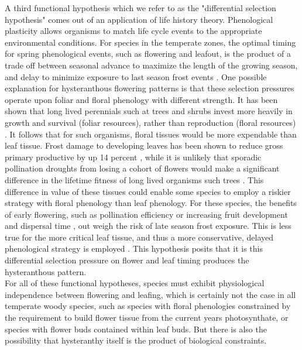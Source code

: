 \documentclass{article}
\begin{document}
\indent A third functional hypothesis which we refer to as the "differential selection hypothesis" comes out of an application of life history theory. Phenological plasticity allows organisms to match life cycle events to the appropriate environmental conditions. For species in the temperate zones, the optimal timing for spring phenological events, such as flowering and leafout, is the product of a trade off between seasonal advance to maximize the length of the growing season, and delay to minimize exposure to last season frost events \citep{Kramer1995}. One possible explanation for hysteranthous flowering patterns is that these selection pressures operate upon foliar and floral phenology with different strength. It has been shown that long lived perennials such at trees and shrubs invest more heavily in growth and survival (foliar resources), rather than reproduction (floral resources) \citep{Franco2004}. It follows that for such organisms, floral tissues would be more expendable than leaf tissue. Frost damage to developing leaves has been shown to reduce gross primary productive by up 14 percent \citep{Hufkins2012}, while it is unlikely that sporadic pollination droughts from losing a cohort of flowers would make a significant difference in the lifetime fitness of long lived organisms such trees \citep{Knight2005}. This difference in value of these tissues could enable some species to employ a riskier strategy with floral phenology than leaf phenology. For these species, the benefits of early flowering, such as pollination efficiency or increasing fruit development and dispersal time \citep{Primack1987}, out weigh the risk of late season frost exposure. This is less true for the more critical leaf tissue, and thus a more conservative, delayed phenological strategy is employed \citep{Lenz2013}. This hypothesis posits that it is this differential selection pressure on flower and leaf timing produces the hysteranthous pattern.\\
\indent For all of these functional hypotheses, species must exhibit physiological independence between flowering and leafing, which is certainly not the case in all temperate woody species, such as species with floral phenologies constrained by the requirement to build flower tissue from the current years photosynthate, or species with flower buds contained within leaf buds. But there is also the possibility that hysteranthy itself is the product of biological constraints.\\
\end{document}
